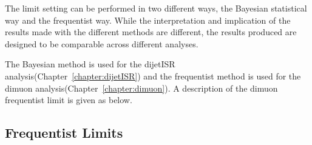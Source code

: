 The limit setting can be performed in two different ways, the Bayesian statistical way and the frequentist way. While the interpretation and implication of the results made with the different methods are different, the results produced are designed to be comparable across different analyses. 

The Bayesian method is used for the dijetISR analysis(Chapter~\ref{chapter:dijetISR}) and the frequentist method is used for the dimuon analysis(Chapter~\ref{chapter:dimuon}). A description of the dimuon frequentist limit is given as below. 

%



\subsection{Frequentist Limits}
\label{sec:freq}

